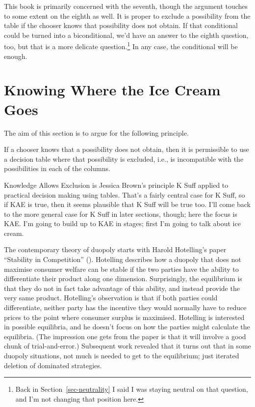 \documentclass[
  10pt,
  letterpaper,
  twoside]{scrbook}
\providecommand{\tightlist}{%
  \setlength{\itemsep}{0pt}\setlength{\parskip}{0pt}}\usepackage{longtable,booktabs,array}
\begin{document}
This book is primarily concerned with the seventh, though the argument
touches to some extent on the eighth as well. It is proper to exclude a
possibility from the table if the chooser knows that possibility does
not obtain. If that conditional could be turned into a biconditional,
we'd have an answer to the eighth question, too, but that is a more
delicate question.\footnote{Back in Section~\ref{sec-neutrality} I said
  I was staying neutral on that question, and I'm not changing that
  position here.} In any case, the conditional will be enough.

\section{Knowing Where the Ice Cream Goes}\label{sec-icecream}

The aim of this section is to argue for the following principle.

\begin{description}
\tightlist
\item[Knowledge Allows Exclusion (KAE)]
If a chooser knows that a possibility does not obtain, then it is
permissible to use a decision table where that possibility is excluded,
i.e., is incompatible with the possibilities in each of the columns.
\end{description}

Knowledge Allows Exclusion is Jessica Brown's principle K Suff applied
to practical decision making using tables. That's a fairly central case
for K Suff, so if KAE is true, then it seems plausible that K Suff will
be true too. I'll come back to the more general case for K Suff in later
sections, though; here the focus is KAE. I'm going to build up to KAE in
stages; first I'm going to talk about ice cream.

The contemporary theory of duopoly starts with Harold Hotelling's paper
``Stability in Competition'' ().
Hotelling describes how a duopoly that does not maximise consumer
welfare can be stable if the two parties have the ability to
differentiate their product along one dimension. Surprisingly, the
equilibrium is that they do not in fact take advantage of this ability,
and instead provide the very same product. Hotelling's observation is
that if both parties could differentiate, neither party has the
incentive they would normally have to reduce prices to the point where
consumer surplus is maximised. Hotelling is interested in possible
equilibria, and he doesn't focus on how the parties might calculate the
equilibria. (The impression one gets from the paper is that it will
involve a good chunk of trial-and-error.) Subsequent work revealed that
it turns out that in some duopoly situations, not much is needed to get
to the equilibrium; just iterated deletion of dominated strategies.
\end{document}
